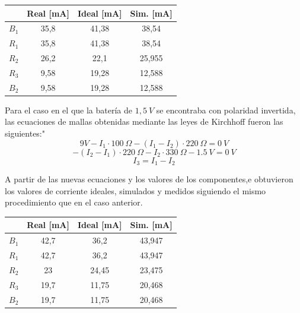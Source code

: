 \begin{table}[H]
\centering
\begin{tabular}{|l|c|c|c|}
\hline
\rowcolor{blue!30} \textbf{} & \textbf{Real [mA]} & \textbf{Ideal [mA]} & \textbf{Sim. [mA]} \\
\hline
$B_1$ & 35,8 & 41,38 & 38,54  \\
$R_1$ & 35,8 & 41,38 & 38,54  \\
$R_2$ & 26,2 & 22,1  & 25,955 \\
$R_3$ & 9,58 & 19,28 & 12,588 \\
$B_2$ & 9,58 & 19,28 & 12,588 \\
\hline
\end{tabular}
\label{tab:no_invertida}
\end{table}




Para el caso en el que la batería de $1,5\ V$ se encontraba con polaridad invertida, las ecuaciones de mallas obtenidas mediante las leyes de Kirchhoff fueron las siguientes:"
\begin{equation*}
    9V-I_1 \cdot100\ \Omega-(I_1-I_2) \cdot 220\ \Omega = 0\ V    
\end{equation*}
\begin{equation*}
    -(I_2-I_1)\cdot 220\ \Omega -I_2\cdot 330\ \Omega -1.5\ V = 0\ V   
\end{equation*}
\begin{equation*}
    I_3 = I_1 - I_2 
\end{equation*}


A partir de las nuevas ecuaciones y los valores de los componentes,e obtuvieron los valores de corriente ideales, simulados y medidos siguiendo el mismo procedimiento que en el caso anterior.

\begin{table}[H]
\centering
\begin{tabular}{|l|c|c|c|}
\hline
\rowcolor{blue!30} \textbf{} & \textbf{Real [mA]} & \textbf{Ideal [mA]} & \textbf{Sim. [mA]} \\
\hline
$B_1$ & 42,7 & 36,2  & 43,947 \\
$R_1$ & 42,7 & 36,2  & 43,947 \\
$R_2$ & 23   & 24,45 & 23,475 \\
$R_3$ & 19,7 & 11,75 & 20,468 \\
$B_2$ & 19,7 & 11,75 & 20,468 \\
\hline
\end{tabular}
\label{tab:invertida}
\end{table}


\newpage